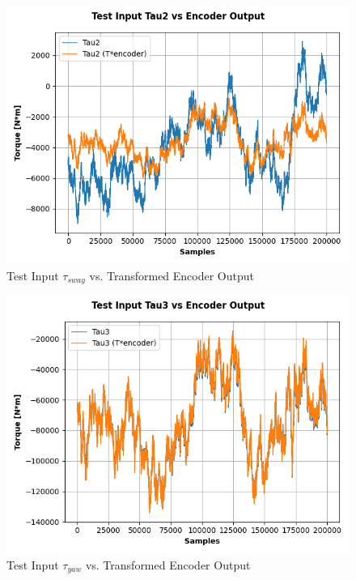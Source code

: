 \documentclass{article}
\begin{document}
\begin{figure}[H]
    \centering
    \includegraphics[scale=0.65]{../best_outputs/transform2_fig.png}
    \caption{Test Input $\tau_{sway}$ vs. Transformed Encoder Output}
    \label{fig:transform2}
\end{figure}

\begin{figure}[H]
    \centering
    \includegraphics[scale=0.65]{../best_outputs/transform3_fig.png}
    \caption{Test Input $\tau_{yaw}$ vs. Transformed Encoder Output}
    \label{fig:transform3}
\end{figure}
\end{document}
